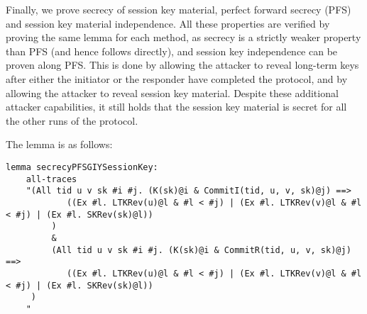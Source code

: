 Finally, we prove secrecy of session key material, perfect forward secrecy
(PFS) and session key material independence.
%
All these properties are verified by proving the same lemma for each method,
as secrecy is a strictly weaker property than PFS (and hence follows
directly), and session key independence can be proven along PFS.
%
This is done by allowing the attacker to reveal long-term keys after either
the initiator or the responder have completed the protocol, and by
allowing the attacker to reveal session key material.
%
Despite these additional attacker capabilities, it still holds that the session
key material is secret for all the other runs of the protocol.
%

The lemma is as follows:
\begin{lstlisting}
lemma secrecyPFSGIYSessionKey:
	all-traces
    "(All tid u v sk #i #j. (K(sk)@i & CommitI(tid, u, v, sk)@j) ==>
            ((Ex #l. LTKRev(u)@l & #l < #j) | (Ex #l. LTKRev(v)@l & #l < #j) | (Ex #l. SKRev(sk)@l))
         )
         &
         (All tid u v sk #i #j. (K(sk)@i & CommitR(tid, u, v, sk)@j) ==>
            ((Ex #l. LTKRev(u)@l & #l < #j) | (Ex #l. LTKRev(v)@l & #l < #j) | (Ex #l. SKRev(sk)@l))
     )
    "
\end{lstlisting}


